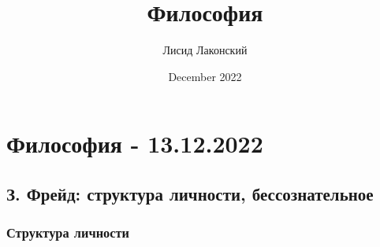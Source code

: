 \documentclass{article}
\title{Философия}
\author{Лисид Лаконский}
\date{December 2022}
\begin{document}
\maketitle
\tableofcontents
\pagebreak

\section{Философия - 13.12.2022}

\subsection{З. Фрейд: структура личности, бессознательное}

\subsubsection{Структура личности}
\end{document}
